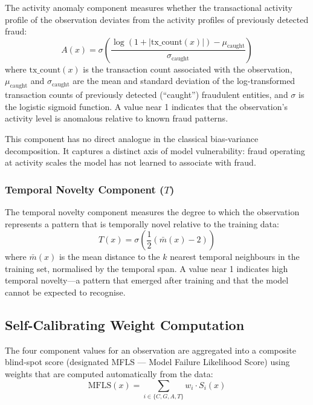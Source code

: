 \documentclass[12pt,a4paper]{article}
\begin{document}
The activity anomaly component measures whether the transactional activity 
profile of the observation deviates from the activity profiles of previously 
detected fraud:
\begin{equation}
A(x) = \sigma\left(\frac{\log(1 + |\text{tx\_count}(x)|) - 
\mu_{\text{caught}}}{\sigma_{\text{caught}}}\right)
\end{equation}
where $\text{tx\_count}(x)$ is the transaction count associated with the 
observation, $\mu_{\text{caught}}$ and $\sigma_{\text{caught}}$ are the mean 
and standard deviation of the log-transformed transaction counts of 
previously detected (``caught'') fraudulent entities, and $\sigma$ is the 
logistic sigmoid function. A value near 1 indicates that the observation's 
activity level is anomalous relative to known fraud patterns.

This component has no direct analogue in the classical bias-variance 
decomposition. It captures a distinct axis of model vulnerability: fraud 
operating at activity scales the model has not learned to associate with 
fraud.

\subsubsection{Temporal Novelty Component ($T$)}

The temporal novelty component measures the degree to which the observation 
represents a pattern that is temporally novel relative to the training data:
\begin{equation}
T(x) = \sigma\left(\frac{1}{2}(\bar{m}(x) - 2)\right)
\end{equation}
where $\bar{m}(x)$ is the mean distance to the $k$ nearest temporal 
neighbours in the training set, normalised by the temporal span. A value 
near 1 indicates high temporal novelty---a pattern that emerged after 
training and that the model cannot be expected to recognise.

\subsection{Self-Calibrating Weight Computation}

The four component values for an observation are aggregated into a composite 
blind-spot score (designated MFLS --- Model Failure Likelihood Score) using 
weights that are computed automatically from the data:
\begin{equation}
\text{MFLS}(x) = \sum_{i \in \{C, G, A, T\}} w_i \cdot S_i(x)
\end{equation}
\end{document}
